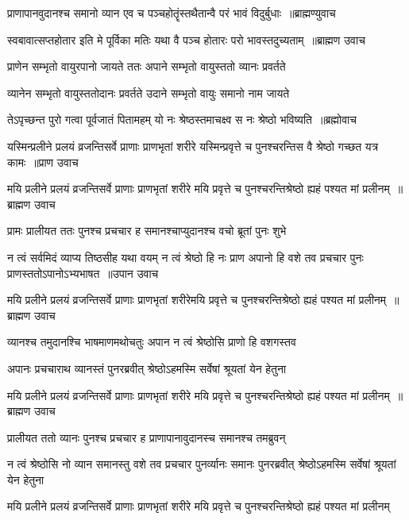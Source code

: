 \threelineshloka
{प्राणापानवुदानश्च समानो व्यान एव च}
{पञ्चहोतॄंस्तथैतान्वै परं भावं विदुर्बुधाः ॥ब्राह्मण्युवाच}
{}


\threelineshloka
{स्वबावात्सप्तहोतार इति मे पूर्विका मतिः}
{यथा वै पञ्च होतारः परो भावस्तदुच्यताम् ॥ब्राह्मण उवाच}
{}


\twolineshloka
{प्राणेन सम्भृतो वायुरपानो जायते ततः}
{अपाने सम्भृतो वायुस्ततो व्यानः प्रवर्तते}


\twolineshloka
{व्यानेन सम्भृतो वायुस्ततोदानः प्रवर्तते}
{उदाने सम्भृतो वायुः समानो नाम जायते}


\threelineshloka
{तेऽपृच्छन्त पुरो गत्वा पूर्वजातं पितामहम्}
{यो नः श्रेष्ठस्तमाचक्ष्व स नः श्रेष्ठो भविष्यति ॥ब्रह्मोवाच}
{}


\threelineshloka
{यस्मिन्प्रलीने प्रलयं व्रजन्तिसर्वे प्राणाः प्राणभृतां शरीरे}
{यस्मिन्प्रवृत्ते च पुनश्चरन्तिस वै श्रेष्ठो गच्छत यत्र कामः ॥प्राण उवाच}
{}


\threelineshloka
{मयि प्रलीने प्रलयं व्रजन्तिसर्वे प्राणाः प्राणभृतां शरीरे}
{मयि प्रवृत्ते च पुनश्चरन्तिश्रेष्ठो ह्यहं पश्यत मां प्रलीनम् ॥ब्राह्मण उवाच}
{}


\twolineshloka
{प्रामः प्रालीयत ततः पुनश्च प्रचचार ह}
{समानश्चाप्युदानश्च वचो ब्रूतां पुनः शुभे}


\fourlineindentedshloka
{न त्वं सर्वमिदं व्याप्य तिष्ठसीह यथा वयम्}
{न त्वं श्रेष्ठो हि नः प्राण अपानो हि वशे तव}
{प्रचचार पुनः प्राणस्ततोऽपानोऽभ्यभाषत ॥उपान उवाच}
{}


\twolineshloka
{मयि प्रलीने प्रलयं व्रजन्तिसर्वे प्राणाः प्राणभृतां शरीरेमयि प्रवृत्ते च पुनश्चरन्तिश्रेष्ठो ह्यहं पश्यत मां प्रलीनम् ॥ब्राह्मण उवाच}
{}


\twolineshloka
{व्यानश्च तमुदानश्चि भाषमाणमथोचतुः}
{अपान न त्वं श्रेष्ठोसि प्राणो हि वशगस्तव}


\twolineshloka
{अपानः प्रचचाराथ व्यानस्तं पुनरब्रवीत्}
{श्रेष्ठोऽहमस्मि सर्वेषां श्रूयतां येन हेतुना}


\threelineshloka
{मयि प्रलीने प्रलयं व्रजन्तिसर्वे प्राणाः प्राणभृतां शरीरे}
{मयि प्रवृत्ते च पुनश्चरन्तिश्रेष्ठो ह्यहं पश्यत मां प्रलीनम् ॥ब्राह्मण उवाच}
{}


\twolineshloka
{प्रालीयत ततो व्यानः पुनश्च प्रचचार ह}
{प्राणापानावुदानस्च समानश्च तमब्रुवन्}


\threelineshloka
{न त्वं श्रेष्ठोसि नो व्यान समानस्तु वशे तव}
{प्रचचार पुनर्व्यानः समानः पुनरब्रवीत्}
{श्रेष्ठोऽहमस्मि सर्वेषां श्रूयतां येन हेतुना}


\twolineshloka
{मयि प्रलीने प्रलयं व्रजन्तिसर्वे प्राणाः प्राणभृतां शरीरे}
{मयि प्रवृत्ते च पुनश्चरन्तिश्रेष्ठो ह्यहं पश्यत मां प्रलीनम्}



